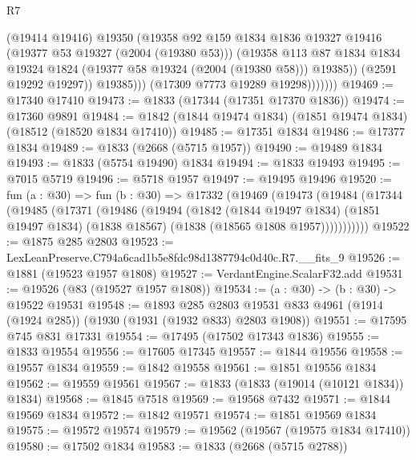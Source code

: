 \begin{lexlean}{R7}
\begin{coremodule}
                        (@19414 @19416)
                        @19350
                        (@19358
                          @92
                          @159
                          @1834
                          @1836
                          @19327
                          @19416
                          (@19377 @53 @19327 (@2004 (@19380 @53)))
                          (@19358
                            @113
                            @87
                            @1834
                            @1834
                            @19324
                            @1824
                            (@19377 @58 @19324 (@2004 (@19380 @58)))
                            @19385))
                        (@2591 @19292 @19297))
                      @19385)))
                (@17309 @7773 @19289 @19298)))))))
@19469 := @17340 @17410
@19473 := @1833 (@17344 (@17351 @17370 @1836))
@19474 := @17360 @9891
@19484 := @1842 (@1844 @19474 @1834) (@1851 @19474 @1834) (@18512 (@18520 @1834 @17410))
@19485 := @17351 @1834
@19486 := @17377 @1834
@19489 := @1833 (@2668 (@5715 @1957))
@19490 := @19489 @1834
@19493 := @1833 (@5754 @19490) @1834
@19494 := @1833 @19493
@19495 := @7015 @5719
@19496 := @5718 @1957
@19497 := @19495 @19496
@19520 := fun (a : @30) =>
  fun (b : @30) =>
  @17332
    (@19469
      (@19473
        (@19484
          (@17344
            (@19485
              (@17371
                (@19486
                  (@19494
                    (@1842
                      (@1844 @19497 @1834)
                      (@1851 @19497 @1834)
                      (@1838 @18567)
                      (@1838 (@18565 @1808 @1957)))))))))))
@19522 := @1875 @285 @2803
@19523 := LexLeanPreserve.C794a6cad1b5e8fdc98d1387794c0d40c.R7.__fits_9
@19526 := @1881 (@19523 @1957 @1808)
@19527 := VerdantEngine.ScalarF32.add
@19531 := @19526 (@83 (@19527 @1957 @1808))
@19534 := (a : @30) -> (b : @30) -> @19522 @19531
@19548 := @1893
    @285
    @2803
    @19531
    @833
    @4961
    (@1914 (@1924 @285))
    (@1930 (@1931 (@1932 @833) @2803 @1908))
@19551 := @17595 @745 @831 @17331
@19554 := @17495 (@17502 @17343 @1836)
@19555 := @1833 @19554
@19556 := @17605 @17345
@19557 := @1844 @19556
@19558 := @19557 @1834
@19559 := @1842 @19558
@19561 := @1851 @19556 @1834
@19562 := @19559 @19561
@19567 := @1833 (@1833 (@19014 (@10121 @1834)) @1834)
@19568 := @1845 @7518
@19569 := @19568 @7432
@19571 := @1844 @19569 @1834
@19572 := @1842 @19571
@19574 := @1851 @19569 @1834
@19575 := @19572 @19574
@19579 := @19562 (@19567 (@19575 @1834 @17410))
@19580 := @17502 @1834
@19583 := @1833 (@2668 (@5715 @2788))

\end{coremodule}
\end{lexlean}
